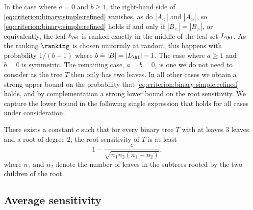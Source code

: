 In the case where $a = 0$ and $b \ge 1$, the right-hand side of
\eqref{eq:criterion:binary:simple:refined} vanishes, as do $|A_<|$ and $|A_>|$, so \eqref{eq:criterion:binary:simple:refined} holds if and only if $|B_<| = |B_>|$, or equivalently, the leaf $\ell_\hi$ is ranked exactly in the middle of the leaf set $L_\hi$. As the ranking $\ranking$ is chosen uniformly at random, this happens with probability $1/(b+1)$ where $b \doteq |B| = |L_\hi|-1$. The case where $a \ge 1$ and $b=0$ is symmetric. The remaining case, $a=b=0$, is one we do not need to consider as the tree $T$ then only has two leaves. In all other cases we obtain a strong upper bound on the probability that \eqref{eq:criterion:binary:simple:refined} holds, and by complementation a strong lower bound on the root sensitivity. We capture the lower bound in the following single expression that holds for all cases under consideration.
\begin{lemma}\label{lemma:sensitivity:root}
There exists a constant $c$ such that for every binary tree $T$ with at leaves 3 leaves and a root of degree 2, the root sensitivity of $T$ is at least 
\begin{equation}\label{eq:root:bound}
1 - \frac{c}{\sqrt{n_1 n_2 (n_1+n_2)}},
\end{equation}
where $n_1$ and $n_2$ denote the number of leaves in the subtrees rooted by the two children of the root.
\end{lemma}

\subsection{Average sensitivity}
\label{sec:sensitivity:average}

